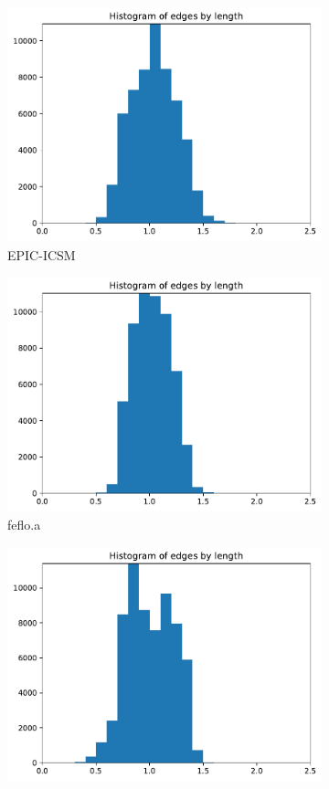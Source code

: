 \documentclass[3p,times,procedia,number]{elsarticle}
\begin{document}
\begin{figure}
\begin{subfigure}{.16\textwidth}
\includegraphics[width=\textwidth]{epic-icsm-cube-linear-length.pdf}
\caption{EPIC-ICSM}
\end{subfigure}
\begin{subfigure}{.16\textwidth}
\centering
\includegraphics[width=\textwidth]{fefloa-cube-linear-length.pdf}
\caption{feflo.a}
\end{subfigure}
\begin{subfigure}{.16\textwidth}
\centering
\includegraphics[width=\textwidth]{omega_h-cube-linear-length.pdf}

\end{subfigure}
\end{figure}
\end{document}

